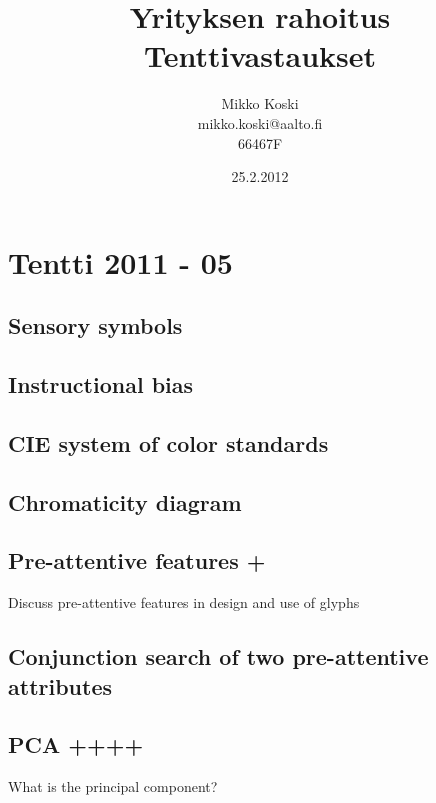 \documentclass[a4paper]{article}
\begin{document}
\title{\small Yrityksen rahoitus \\ \huge Tenttivastaukset}
\date{25.2.2012}
\author{Mikko Koski \\ mikko.koski@aalto.fi \\ 66467F}
\maketitle

\normalsize
\setlength{\parindent}{0cm}

\section{Tentti 2011 - 05}

\subsection{Sensory symbols}

\subsection{Instructional bias}

\subsection{CIE system of color standards}

\subsection{Chromaticity diagram}

\subsection{Pre-attentive features +}

Discuss pre-attentive features in design and use of glyphs

\subsection{Conjunction search of two pre-attentive attributes}

\subsection{PCA ++++}

What is the principal component?
\end{document}
